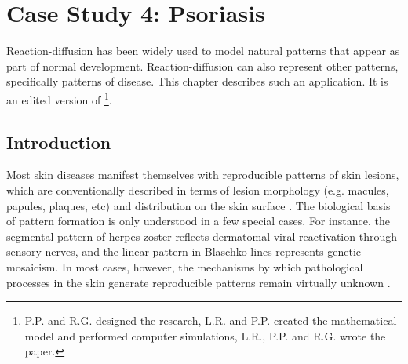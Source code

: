 \chapter{Case Study 4: Psoriasis}
Reaction-diffusion has been widely used to model natural patterns that appear as part of normal development. Reaction-diffusion can also represent other patterns, specifically patterns of disease. This chapter describes such an application. It is an edited version of \citep{ringham2019}\footnote{P.P. and R.G. designed the research, L.R. and P.P. created the mathematical model and performed computer simulations, L.R., P.P. and R.G. wrote the paper.}.

\section{Introduction} 
Most skin diseases manifest themselves with reproducible patterns of skin lesions, which are conventionally described in terms of lesion morphology (e.g. macules, papules, plaques, etc) and distribution on the skin surface \citep{nast2016}. The biological basis of pattern formation is only understood in a few special cases. For instance, the segmental pattern of herpes zoster reflects dermatomal viral reactivation through sensory nerves, and the linear pattern in Blaschko lines represents genetic mosaicism. In most cases, however, the mechanisms by which pathological processes in the skin generate reproducible patterns remain virtually unknown \citep{nast2016}.
